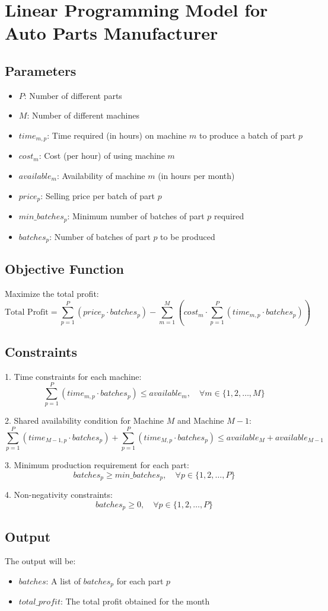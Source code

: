 \documentclass{article}
\begin{document}
\section*{Linear Programming Model for Auto Parts Manufacturer}

\subsection*{Parameters}
\begin{itemize}
    \item $P$: Number of different parts
    \item $M$: Number of different machines
    \item $time_{m,p}$: Time required (in hours) on machine $m$ to produce a batch of part $p$
    \item $cost_{m}$: Cost (per hour) of using machine $m$
    \item $available_{m}$: Availability of machine $m$ (in hours per month)
    \item $price_{p}$: Selling price per batch of part $p$
    \item $min\_batches_{p}$: Minimum number of batches of part $p$ required
    \item $batches_{p}$: Number of batches of part $p$ to be produced
\end{itemize}

\subsection*{Objective Function}
Maximize the total profit:
\[
\text{Total Profit} = \sum_{p=1}^{P} (price_{p} \cdot batches_{p}) - \sum_{m=1}^{M} (cost_{m} \cdot \sum_{p=1}^{P} (time_{m,p} \cdot batches_{p}))
\]

\subsection*{Constraints}
1. Time constraints for each machine:
\[
\sum_{p=1}^{P} (time_{m,p} \cdot batches_{p}) \leq available_{m}, \quad \forall m \in \{1, 2, \ldots, M\}
\]

2. Shared availability condition for Machine $M$ and Machine $M-1$:
\[
\sum_{p=1}^{P} (time_{M-1,p} \cdot batches_{p}) + \sum_{p=1}^{P} (time_{M,p} \cdot batches_{p}) \leq available_{M} + available_{M-1}
\]

3. Minimum production requirement for each part:
\[
batches_{p} \geq min\_batches_{p}, \quad \forall p \in \{1, 2, \ldots, P\}
\]

4. Non-negativity constraints:
\[
batches_{p} \geq 0, \quad \forall p \in \{1, 2, \ldots, P\}
\]

\subsection*{Output}
The output will be:
\begin{itemize}
    \item $batches$: A list of $batches_{p}$ for each part $p$
    \item $total\_profit$: The total profit obtained for the month
\end{itemize}
\end{document}
